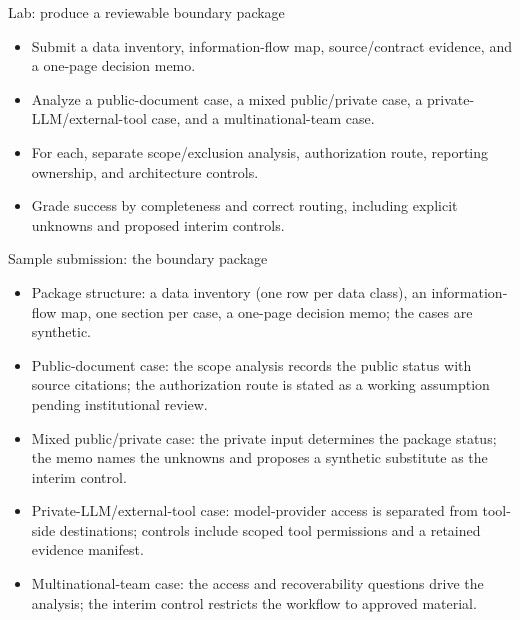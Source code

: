 \documentclass[aspectratio=169,11pt]{beamer}
\begin{document}
\begin{frame}[t,fragile]{Lab: produce a reviewable boundary package}
\fontsize{11.5}{14}\selectfont
\begin{itemize}\setlength{\itemsep}{2mm}
\item Submit a data inventory, information-flow map, source/contract evidence, and a one-page decision memo.
\item Analyze a public-document case, a mixed public/private case, a private-LLM/external-tool case, and a multinational-team case.
\item For each, separate scope/exclusion analysis, authorization route, reporting ownership, and architecture controls.
\item Grade success by completeness and correct routing, including explicit unknowns and proposed interim controls.
\end{itemize}
\end{frame}
\begin{frame}[t,fragile]{Sample submission: the boundary package}
\fontsize{11.5}{14}\selectfont
\begin{itemize}\setlength{\itemsep}{2mm}
\item Package structure: a data inventory (one row per data class), an information-flow map, one section per case, a one-page decision memo; the cases are synthetic.
\item Public-document case: the scope analysis records the public status with source citations; the authorization route is stated as a working assumption pending institutional review.
\item Mixed public/private case: the private input determines the package status; the memo names the unknowns and proposes a synthetic substitute as the interim control.
\item Private-LLM/external-tool case: model-provider access is separated from tool-side destinations; controls include scoped tool permissions and a retained evidence manifest.
\item Multinational-team case: the access and recoverability questions drive the analysis; the interim control restricts the workflow to approved material.
\end{itemize}
\end{frame}
\end{document}
